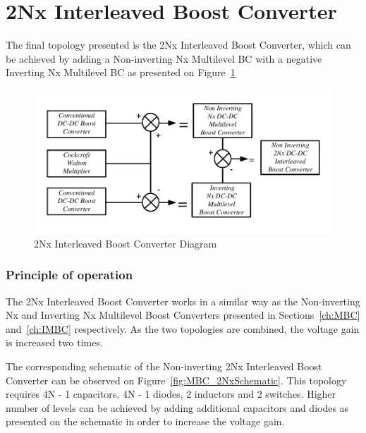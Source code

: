 \section{2Nx Interleaved Boost Converter}\label{ch:2Nx}

The final topology presented is the 2Nx Interleaved Boost Converter, which can be achieved by adding a Non-inverting Nx Multilevel BC with a negative Inverting Nx Multilevel BC as presented on Figure~\ref{fig:MBC_2NxDiagram}

\begin{figure}[H]
   \centering
   \includegraphics[width=\textwidth]{figures/yMultilevel/2Nx_Diagram.pdf}
    \caption{2Nx Interleaved Boost Converter Diagram}
	\label{fig:MBC_2NxDiagram}
\end{figure}

\subsubsection{Principle of operation}

The 2Nx Interleaved Boost Converter works in a similar way as the Non-inverting Nx and Inverting Nx Multilevel Boost Converters presented in Sections~\ref{ch:MBC} and~\ref{ch:IMBC} respectively. As the two topologies are combined, the voltage gain is increased two times.

The corresponding schematic of the Non-inverting 2Nx Interleaved Boost Converter can be observed on Figure~\ref{fig:MBC_2NxSchematic}. This topology requires 4N - 1 capacitors, 4N - 1 diodes, 2 inductors and 2 switches. Higher number of levels can be achieved by adding additional capacitors and diodes as presented on the schematic in order to increase the voltage gain.

